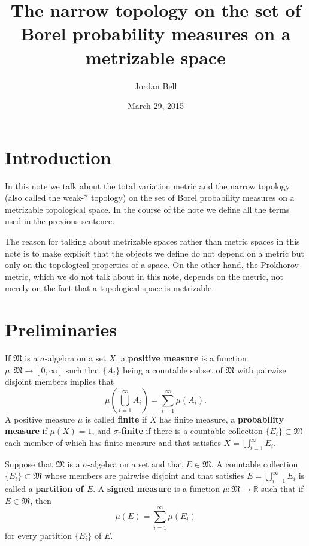 \documentclass{article}
\theoremstyle{definition}
\theoremstyle{definition}
\begin{document}
\title{The narrow topology on the set of Borel probability measures on a metrizable space}
\author{Jordan Bell}
\date{March 29, 2015}

\maketitle

\section{Introduction}
In this note we talk about the total variation metric and the narrow topology (also called the weak-* topology) on the set of Borel probability measures on a metrizable topological space.
In the course of the note we define all the terms used in the previous sentence. 

The reason for talking about metrizable spaces rather than metric spaces in this note is to make explicit that the objects we define do not depend on a metric but only on the topological
properties of a space. On the other hand, the Prokhorov metric, which we do not talk about in this note, depends on the metric, not merely on the fact
that a topological space is metrizable.

\section{Preliminaries}
If $\mathfrak{M}$ is a $\sigma$-algebra on a set $X$, a \textbf{positive measure} is a function
$\mu:\mathfrak{M} \to [0,\infty]$ such that $\{A_i\}$ being a countable subset of $\mathfrak{M}$ with pairwise disjoint
members implies that 
\[
\mu\left( \bigcup_{i=1}^\infty A_i\right) = \sum_{i=1}^\infty \mu(A_i).
\]
A positive measure $\mu$ is called \textbf{finite} if $X$ has finite measure, a \textbf{probability measure} if $\mu(X)=1$, and \textbf{$\sigma$-finite}
if there is a countable collection $\{E_i\} \subset \mathfrak{M}$ each member of which has finite measure and that satisfies  $X = \bigcup_{i=1}^\infty E_i$.



Suppose that $\mathfrak{M}$ is a $\sigma$-algebra on a set and that $E \in \mathfrak{M}$. 
A countable collection $\{E_i\} \subset \mathfrak{M}$ whose members are pairwise disjoint and that satisfies $E = \bigcup_{i=1}^\infty E_i$ is called
a \textbf{partition of $E$}. A \textbf{signed measure} is a function $\mu:\mathfrak{M} \to \mathbb{R}$ such that if
$E \in \mathfrak{M}$, then
\begin{equation}
\mu(E) = \sum_{i=1}^\infty \mu(E_i)
\label{unordered}
\end{equation}
for every partition $\{E_i\}$ of $E$. 
\end{document}
